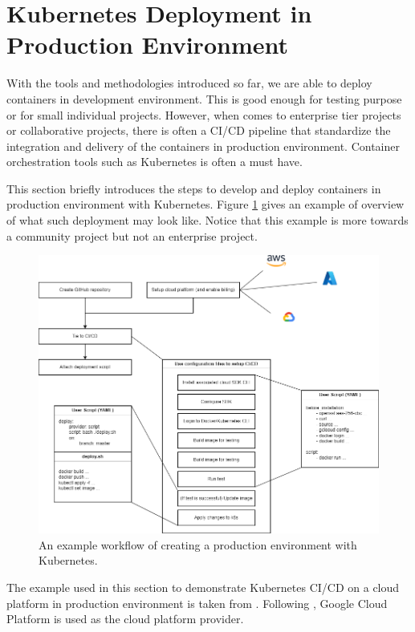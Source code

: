 \section{Kubernetes Deployment in Production Environment}

With the tools and methodologies introduced so far, we are able to deploy containers in development environment. This is good enough for testing purpose or for small individual projects. However, when comes to enterprise tier projects or collaborative projects, there is often a CI/CD pipeline that standardize the integration and delivery of the containers in production environment. Container orchestration tools such as Kubernetes is often a must have.

This section briefly introduces the steps to develop and deploy containers in production environment with Kubernetes. Figure \ref{ch:vac:fig:prodenvworkflow} gives an example of overview of what such deployment may look like. Notice that this example is more towards a community project but not an enterprise project.

\begin{figure}[htbp]
	\centering
	\includegraphics[width=350pt]{chapters/part-3/figures/prodenvworkflow.png}
	\caption{An example workflow of creating a production environment with Kubernetes.} \label{ch:vac:fig:prodenvworkflow}
\end{figure}

The example used in this section to demonstrate Kubernetes CI/CD on a cloud platform in production environment is taken from \cite{stephen2023docker}. Following \cite{stephen2023docker}, Google Cloud Platform is used as the cloud platform provider.

